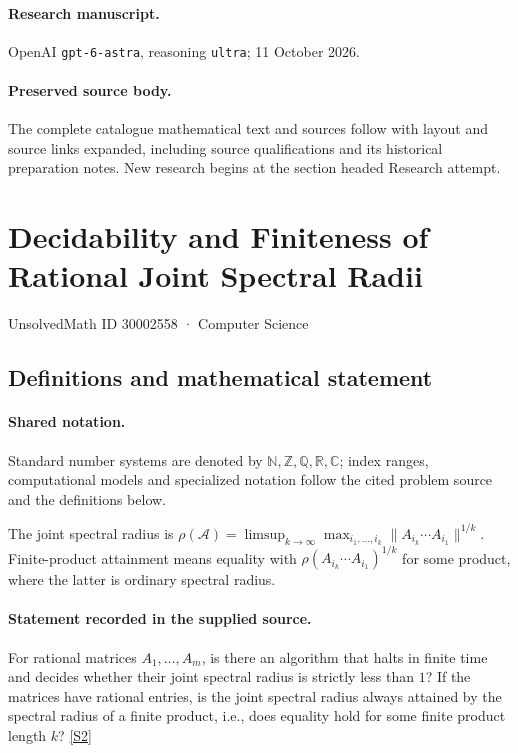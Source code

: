 \documentclass[11pt]{article}
\begin{document}
\paragraph{Research manuscript.} OpenAI \texttt{gpt-6-astra}, reasoning \texttt{ultra}; 11 October 2026.
\paragraph{Preserved source body.} The complete catalogue mathematical text and sources follow with layout and source links expanded, including source qualifications and its historical preparation notes. New research begins at the section headed Research attempt.

\section{Decidability and Finiteness of Rational Joint Spectral Radii}\label{30002558}
{\small UnsolvedMath ID 30002558 · Computer Science}
\subsection{Definitions and mathematical statement}

\paragraph{Shared notation.}Standard number systems are denoted by $\mathbb N,\mathbb Z,\mathbb Q,\mathbb R,\mathbb C$; index ranges, computational models and specialized notation follow the cited problem source and the definitions below.


The joint spectral radius is $\rho(\mathcal A)=\limsup_{k\to\infty}\max_{i_1,\ldots,i_k}\lVert A_{i_k}\cdots A_{i_1}\rVert^{1/k}$. Finite-product attainment means equality with $\rho(A_{i_k}\cdots A_{i_1})^{1/k}$ for some product, where the latter is ordinary spectral radius.
\paragraph{Statement recorded in the supplied source.}
For rational matrices $A_1,\ldots,A_m$, is there an algorithm that halts in finite time and decides whether their joint spectral radius is strictly less than $1$? If the matrices have rational entries, is the joint spectral radius always attained by the spectral radius of a finite product, i.e., does equality hold for some finite product length $k$? \href{https://doi.org/10.4171/owr/2014/17}{[S2]}
\end{document}
